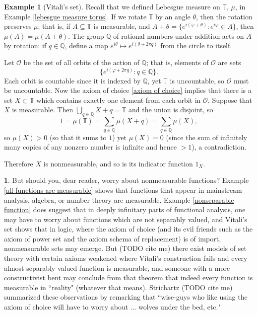 \documentclass[12pt]{book}
\newcommand{\QQ}{\mathbb{Q}}
\newcommand{\Torus}{\mathbb{T}}
\theoremstyle{definition}
\newtheorem{subsec}[theorem]{}
\newtheorem{example}[theorem]{Example}
\begin{document}
\begin{example}[Vitali's set]
\label{Vitali set}
Recall that we defined Lebesgue measure on $\Torus$, $\mu$, in Example \ref{lebesgue measure torus}.
If we rotate $\Torus$ by an angle $\theta$, then the rotation preserves $\mu$; that is, if $A \subseteq \Torus$ is measurable, and $A + \theta = \{e^{i(\varphi+\theta)}: e^{i\varphi} \in A\}$, then $\mu(A) = \mu(A + \theta)$.
The group $\QQ$ of rational numbers under addition acts on $A$ by rotation: if $q \in \QQ$, define a map $e^{i\theta} \mapsto e^{i(\theta + 2\pi q)}$ from the circle to itself.

Let $\mathcal O$ be the set of all orbits of the action of $\QQ$; that is, elements of $\mathcal O$ are sets
$$\{e^{i(\varphi+2\pi q)}: q \in \QQ\}.$$
Each orbit is countable since it is indexed by $\QQ$, yet $\Torus$ is uncountable, so $\mathcal O$ must be uncountable.
Now the axiom of choice \ref{axiom of choice} implies that there is a set $X \subset \Torus$ which contains exactly one element from each orbit in $\mathcal O$.
Suppose that $X$ is measurable. Then $\bigcup_{q \in \QQ} X + q = \Torus$ and the union is disjoint, so
$$1 = \mu(\Torus) = \sum_{q \in \QQ} \mu(X +  q) = \sum_{q \in \QQ} \mu(X),$$
so $\mu(X) > 0$ (so that it sums to $1$) yet $\mu(X) = 0$ (since the sum of infinitely many copies of any nonzero number is infinite and hence $> 1$), a contradiction.

Therefore $X$ is nonmeasurable, and so is its indicator function $1_X$.
\end{example}

\begin{subsec}
But should you, dear reader, worry about nonmeasurable functions?
Example \ref{all functions are measurable} shows that functions that appear in mainstream analysis, algebra, or number theory are measurable.
Example \ref{nonseparable function} does suggest that in deeply infinitary parts of functional analysis, one may have to worry about functions which are not separably valued, and Vitali's set shows that in logic, where the axiom of choice (and its evil friends such as the axiom of power set and the axiom schema of replacement) is of import, nonmeasurable sets may emerge.
But (TODO cite me) there exist models of set theory with certain axioms weakened where Vitali's construction fails and every almost separably valued function is measurable, and someone with a more constructivist bent may conclude from that theorem that indeed every function is measurable in ``reality" (whatever that means).
Strichartz (TODO cite me) summarized these observations by remarking that ``wise-guys who like using the axiom of choice will have to worry about ... wolves under the bed, etc."
\end{subsec}
\end{document}
